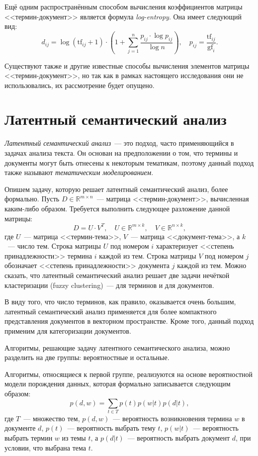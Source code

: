 Ещё одним распространённым способом вычисления коэффициентов
матрицы <<термин-документ>> является формула \textit{log-entropy}.
Она имеет следующий вид:
\begin{equation}\label{eq:log_entropy}
    d_{ij} = \log{(\mathrm{tf}_{ij} + 1)} \cdot
    (1 + \sum_{j=1}^{n} \frac{p_{ij} \cdot \log{p_{ij}}}{\log{n}}),\quad
    p_{ij} = \frac{\mathrm{tf}_{ij}}{\mathrm{gf}_i}.
\end{equation}

Существуют также и другие известные способы вычисления элементов
матрицы <<термин-документ>>, но так как в рамках настоящего исследования
они не использовались, их рассмотрение будет опущено.

\section{Латентный семантический анализ}
\label{sec:latent_semantic_analysis}
\textit{Латентный семантический анализ}~--- это подход,
часто применяющийся в задачах анализа текста. Он основан на
предположении о том, что термины и документы могут быть отнесены
к некоторым тематикам, поэтому данный подход также называют
\textit{тематическим моделированием}.

Опишем задачу, которую решает латентный семантический анализ,
более формально. Пусть $D \in \mathbb{R}^{m \times n}$~--- матрица 
<<термин-документ>>, вычисленная каким-либо образом. Требуется
выполнить следующее разложение данной матрицы:
\[
    D = U \cdot V^T,\quad U \in \mathbb{R}^{m \times k},\quad V \in \mathbb{R}^{n \times k},
\]
где $U$~--- матрица <<термин-тема>>, $V$~--- матрица <<документ-тема>>,
а $k$~--- число тем. Строка матрицы $U$ под номером $i$ 
характеризует <<степень принадлежности>> термина $i$ 
каждой из тем. Строка матрицы $V$ под номером $j$ обозначает
<<степень принадлежности>> документа $j$ каждой из тем.
Можно сказать, что латентный семантический анализ решает
две задачи нечёткой кластеризации (fuzzy clustering)~--- для
терминов и для документов.

В виду того, что число терминов, как правило,
оказывается очень большим, латентный семантический анализ
применяется для более компактного представления 
документов в векторном пространстве. Кроме того, данный подход
применим для категоризации документов.

Алгоритмы, решающие задачу латентного семантического анализа,
можно разделить на две группы: вероятностные и остальные.

Алгоритмы, относящиеся к первой группе, реализуются на
основе вероятностной модели порождения данных, которая
формально записывается следующим образом:
\[
    p(d, w) = \sum_{t \in T} p(t)p(w|t)p(d|t),
\]
где $T$~--- множество тем, $p(d, w)$~--- вероятность возникновения
термина $w$ в документе $d$, $p(t)$~--- вероятность выбрать тему $t$,
$p(w|t)$~--- вероятность выбрать термин $w$ из темы $t$, а
$p(d|t)$~--- вероятность выбрать документ $d$, при условии, что
выбрана тема $t$.

